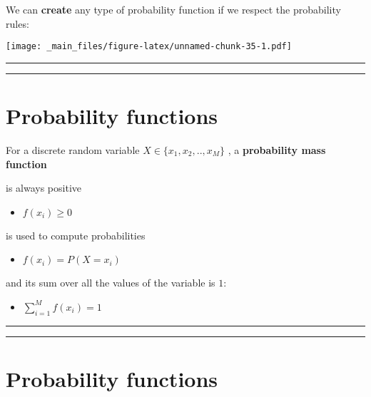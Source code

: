 \documentclass[
]{book}
\providecommand{\tightlist}{%
  \setlength{\itemsep}{0pt}\setlength{\parskip}{0pt}}
\begin{document}
We can \textbf{create} any type of probability function if we respect the probability rules:

\texttt{[image: \_main\_files/figure-latex/unnamed-chunk-35-1.pdf]}

\begin{center}\rule{0.5\linewidth}{0.5pt}\end{center}

\begin{center}\rule{0.5\linewidth}{0.5pt}\end{center}

\hypertarget{probability-functions-2}{%
\section{Probability functions}\label{probability-functions-2}}

For a discrete random variable \(X \in \{x_1 , x_2 , .. , x_M\}\) , a \textbf{probability mass function}

is always positive

\begin{itemize}
\tightlist
\item
  \(f(x_i)\geq 0\)
\end{itemize}

is used to compute probabilities

\begin{itemize}
\tightlist
\item
  \(f(x_i)=P(X=x_i)\)
\end{itemize}

and its sum over all the values of the variable is \(1\):

\begin{itemize}
\tightlist
\item
  \(\sum_{i=1}^M f(x_i)=1\)
\end{itemize}

\begin{center}\rule{0.5\linewidth}{0.5pt}\end{center}

\begin{center}\rule{0.5\linewidth}{0.5pt}\end{center}

\hypertarget{probability-functions-3}{%
\section{Probability functions}\label{probability-functions-3}}
\end{document}
